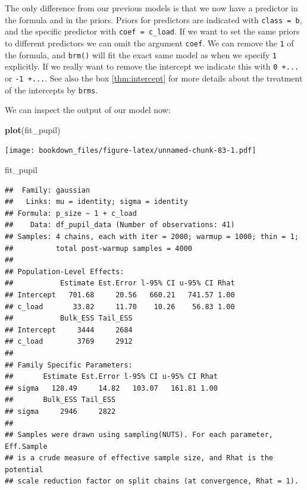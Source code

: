 \documentclass[12pt,]{krantz}
\newenvironment{Shaded}{\begin{snugshade}}{\end{snugshade}}
\newcommand{\KeywordTok}[1]{\textcolor[rgb]{0.13,0.29,0.53}{\textbf{#1}}}
\newcommand{\NormalTok}[1]{#1}
\theoremstyle{definition}
\theoremstyle{definition}
\theoremstyle{definition}
\theoremstyle{remark}
\begin{document}
The only difference from our previous models is that we now have a predictor in the formula and in the priors. Priors for predictors are indicated with \texttt{class\ =\ b}, and the specific predictor with \texttt{coef\ =\ c\_load}. If we want to set the same priors to different predictors we can omit the argument \texttt{coef}. We can remove the \texttt{1} of the formula, and \texttt{brm()} will fit the exact same model as when we specify \texttt{1} explicitly. If we really want to remove the intercept we indicate this with \texttt{0\ +...} or \texttt{-1\ +...}. See also the box \ref{thm:intercept} for more details about the treatment of the intercepts by \texttt{brms}.

We can inspect the output of our model now:

\begin{Shaded}
\begin{Highlighting}[]
\KeywordTok{plot}\NormalTok{(fit_pupil)}
\end{Highlighting}
\end{Shaded}

\texttt{[image: bookdown\_files/figure-latex/unnamed-chunk-83-1.pdf]}

\begin{Shaded}
\begin{Highlighting}[]
\NormalTok{fit_pupil}
\end{Highlighting}
\end{Shaded}

\begin{verbatim}
##  Family: gaussian 
##   Links: mu = identity; sigma = identity 
## Formula: p_size ~ 1 + c_load 
##    Data: df_pupil_data (Number of observations: 41) 
## Samples: 4 chains, each with iter = 2000; warmup = 1000; thin = 1;
##          total post-warmup samples = 4000
## 
## Population-Level Effects: 
##           Estimate Est.Error l-95% CI u-95% CI Rhat
## Intercept   701.68     20.56   660.21   741.57 1.00
## c_load       33.82     11.70    10.26    56.83 1.00
##           Bulk_ESS Tail_ESS
## Intercept     3444     2684
## c_load        3769     2912
## 
## Family Specific Parameters: 
##       Estimate Est.Error l-95% CI u-95% CI Rhat
## sigma   128.49     14.82   103.07   161.81 1.00
##       Bulk_ESS Tail_ESS
## sigma     2946     2822
## 
## Samples were drawn using sampling(NUTS). For each parameter, Eff.Sample 
## is a crude measure of effective sample size, and Rhat is the potential 
## scale reduction factor on split chains (at convergence, Rhat = 1).
\end{verbatim}
\end{document}
